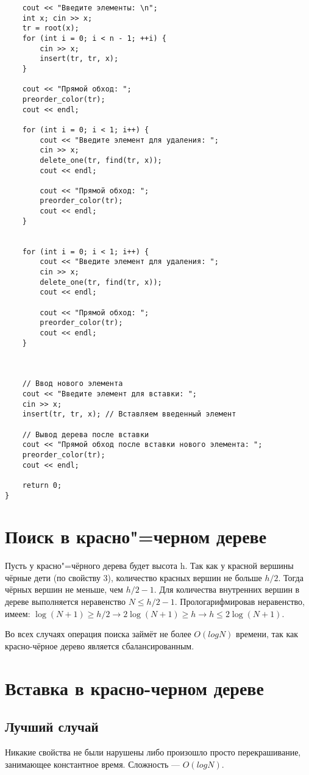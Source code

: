 \documentclass[otchet]{SCWorks}
\begin{document}
\begin{verbatim}
	cout << "Введите элементы: \n";
	int x; cin >> x;
	tr = root(x);
	for (int i = 0; i < n - 1; ++i) {
		cin >> x;
		insert(tr, tr, x);
	}

	cout << "Прямой обход: ";
	preorder_color(tr);
	cout << endl;

	for (int i = 0; i < 1; i++) {
		cout << "Введите элемент для удаления: ";
		cin >> x;
		delete_one(tr, find(tr, x));
		cout << endl;

		cout << "Прямой обход: ";
		preorder_color(tr);
		cout << endl;
	}


	for (int i = 0; i < 1; i++) {
		cout << "Введите элемент для удаления: ";
		cin >> x;
		delete_one(tr, find(tr, x));
		cout << endl;

		cout << "Прямой обход: ";
		preorder_color(tr);
		cout << endl;
	}



	// Ввод нового элемента
	cout << "Введите элемент для вставки: ";
	cin >> x;
	insert(tr, tr, x); // Вставляем введенный элемент

	// Вывод дерева после вставки
	cout << "Прямой обход после вставки нового элемента: ";
	preorder_color(tr);
	cout << endl;

	return 0;
}
\end{verbatim}

\section{Поиск в красно"=черном дереве}
Пусть у красно"=чёрного дерева будет высота h. Так как у красной вершины чёрные дети (по свойству 3), количество красных вершин не больше $h/2$. Тогда чёрных вершин не меньше, чем $h/2 - 1$. Для количества внутренних вершин в дереве выполняется неравенство $N \leq h/2 - 1$. Прологарифмировав неравенство, имеем: $\log{(N + 1)} \geq  h/2 \rightarrow 2\log{(N + 1)} \geq h \rightarrow h \leq 2\log{(N + 1)}$.

Во всех случаях операция поиска займёт не более $O(logN)$ времени, так как красно-чёрное дерево является сбалансированным.

\section{Вставка в красно-черном дереве}
\subsection{Лучший случай}
Никакие свойства не были нарушены либо произошло просто перекрашивание, занимающее константное время. Сложность — $O(logN)$.
\end{document}

